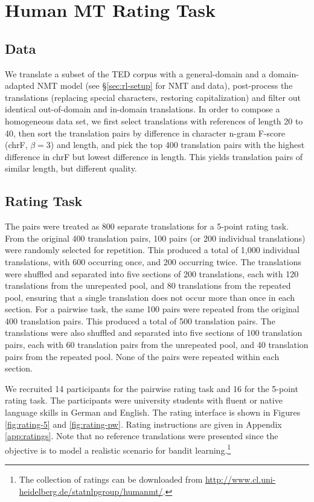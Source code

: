 \section{Human MT Rating Task}
\label{sec:data}

\subsection{Data}
We translate a subset of the TED corpus with a general-domain and a domain-adapted NMT model (see §\ref{sec:rl-setup} for NMT and data), post-process the translations (replacing special characters, restoring capitalization) and filter out identical out-of-domain and in-domain translations. In order to compose a homogeneous data set, we first select translations with references of length 20 to 40, then sort the translation pairs by difference in character n-gram F-score (chrF, $\beta=3$) \cite{Popovic:2015:WMT} and length, and pick the top 400 translation pairs with the highest difference in chrF but lowest difference in length. This yields translation pairs of similar length, but different quality.

\subsection{Rating Task} The pairs were treated as 800 separate translations for a 5-point rating task. From the original 400 translation pairs, 100 pairs (or 200 individual translations) were randomly selected for repetition. This produced a total of 1,000 individual translations, with 600 occurring once, and 200 occurring twice. The translations were shuffled and separated into five sections of 200 translations, each with 120 translations from the unrepeated pool, and 80 translations from the repeated pool, ensuring that a single translation does not occur more than once in each section. For a pairwise task, the same 100 pairs were repeated from the original 400 translation pairs. This produced a total of 500 translation pairs. The translations were also shuffled and separated into five sections of 100 translation pairs, each with 60 translation pairs from the unrepeated pool, and 40 translation pairs from the repeated pool. None of the pairs were repeated within each section. 

We recruited 14 participants for the pairwise rating task and 16 for the 5-point rating task. The participants were university students with fluent or native language skills in German and English. The rating interface is shown in Figures \ref{fig:rating-5} and \ref{fig:rating-pw}. Rating instructions are given in Appendix \ref{app:ratings}. Note that no reference translations were presented since the objective is to model a realistic scenario for bandit learning.\footnote{The collection of ratings can be downloaded from \url{http://www.cl.uni-heidelberg.de/statnlpgroup/humanmt/}.}

